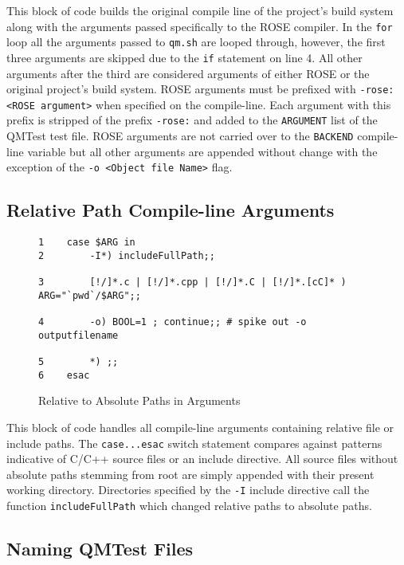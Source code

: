 This block of code builds the original compile line of the project's build
system along with the arguments passed specifically to the ROSE compiler. In
the {\tt for} loop all the arguments passed to {\tt qm.sh} are looped through,
however, the first three arguments are skipped due to the {\tt if} statement on
line 4. All other arguments after the third are considered arguments of either
ROSE or the original project's build system. ROSE arguments must be prefixed
with {\tt -rose:<ROSE argument>} when specified on the compile-line. Each
argument with this prefix is stripped of the prefix {\tt -rose:} and added to
the {\tt ARGUMENT} list of the QMTest test file. ROSE arguments are not
carried over to the {\tt BACKEND} compile-line variable but all other arguments
are appended without change with the exception of the 
{\tt -o <Object file Name>} flag.

\subsection{Relative Path Compile-line Arguments}

\begin{figure}[!ht]
{\scriptsize
\begin{verbatim}
1    case $ARG in
2        -I*) includeFullPath;;
                                                                                
3        [!/]*.c | [!/]*.cpp | [!/]*.C | [!/]*.[cC]* ) ARG="`pwd`/$ARG";;
                                                                                
4        -o) BOOL=1 ; continue;; # spike out -o outputfilename
                                                                                
5        *) ;;
6    esac
\end{verbatim}
}
\caption{Relative to Absolute Paths in Arguments}
\end{figure}

This block of code handles all compile-line arguments containing relative file
or include paths. The {\tt case...esac} switch statement compares against
patterns indicative of C/C++ source files or an include directive. All source
files without absolute paths stemming from root are simply appended with their
present working directory. Directories specified by the {\tt -I} include 
directive call the function {\tt includeFullPath} which changed relative paths
to absolute paths.

\subsection{Naming QMTest Files}

